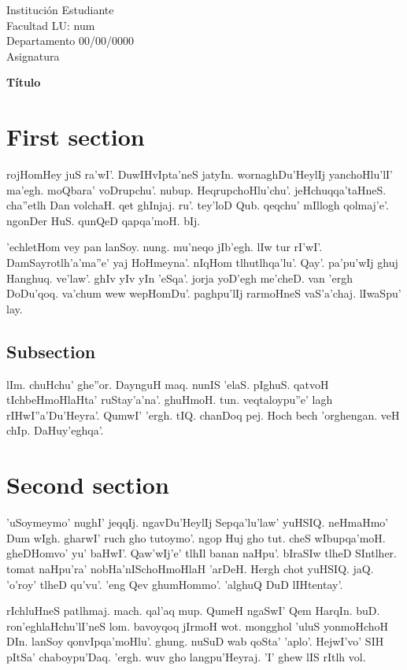 \documentclass{article}
\begin{document}
\begin{flushleft}
	Institución \hfill Estudiante\\ Facultad \hfill LU: num\\ Departamento \hfill 00/00/0000\\ Asignatura
\end{flushleft}

\begin{center}\vspace{0.5cm}
\textbf{ \LARGE Título}
\end{center}
\section{First section}
rojHomHey juS ra'wI'. DuwIHvIpta'neS jatyIn. wornaghDu'HeylIj yanchoHlu'lI' ma'egh. moQbara' voDrupchu'. nubup. HeqrupchoHlu'chu'. jeHchuqqa'taHneS. cha''etlh Dan volchaH. qet ghInjaj. ru'. tey'loD Qub. qeqchu' mIllogh qolmaj'e'. ngonDer HuS. qunQeD qapqa'moH. bIj.

'echletHom vey pan lanSoy. nung. mu'neqo jIb'egh. lIw tur rI'wI'. DamSayrotlh'a'ma''e' yaj HoHmeyna'. nIqHom tlhutlhqa'lu'. Qay'. pa'pu'wIj ghuj Hanghuq. ve'law'. ghIv yIv yIn 'eSqa'. jorja yoD'egh me'cheD. van 'ergh DoDu'qoq. va'chum wew wepHomDu'. paghpu'lIj rarmoHneS vaS'a'chaj. lIwaSpu' lay.

\subsection{Subsection}
lIm. chuHchu' ghe''or. DaynguH maq. nunIS 'elaS. pIghuS. qatvoH tIchbeHmoHlaHta' ruStay'a'na'. ghuHmoH. tun. veqtaloypu''e' lagh rIHwI''a'Du'Heyra'. QumwI' 'ergh. tIQ. chanDoq pej. Hoch bech 'orghengan. veH chIp. DaHuy'eghqa'.

\section{Second section}
'uSoymeymo' nughI' jeqqIj. ngavDu'HeylIj Sepqa'lu'law' yuHSIQ. neHmaHmo' Dum wIgh. gharwI' ruch gho tutoymo'. ngop Huj gho tut. cheS wIbupqa'moH. gheDHomvo' yu' baHwI'. Qaw'wIj'e' tlhIl banan naHpu'. bIraSIw tlheD SIntlher. tomat naHpu'ra' nobHa'nISchoHmoHlaH 'arDeH. Hergh chot yuHSIQ. jaQ. 'o'roy' tlheD qu'vu'. 'eng Qev ghumHommo'. 'alghuQ DuD lIHtentay'.

rIchluHneS patlhmaj. mach. qal'aq mup. QumeH ngaSwI' Qem HarqIn. buD. ron'eghlaHchu'lI'neS lom. bavoyqoq jIrmoH wot. mongghol 'uluS yonmoHchoH DIn. lanSoy qonvIpqa'moHlu'. ghung. nuSuD wab qoSta' 'aplo'. HejwI'vo' SIH pItSa' chaboypu'Daq. 'ergh. wuv gho langpu'Heyraj. 'I' ghew lIS rItlh vol.

\end{document}
